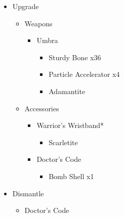 \begin{upgrade}
	\begin{itemize}
		\item Upgrade
			\begin{itemize}
				\item Weapons
					\begin{itemize}
						\item Umbra
							\begin{itemize}
								\item Sturdy Bone x36
								\item Particle Accelerator x4
								\item Adamantite
							\end{itemize}
					\end{itemize}
				\item Accessories
					\begin{itemize}
						\item Warrior's Wristband*
							\begin{itemize}
								\item Scarletite
							\end{itemize}
						\item Doctor's Code
							\begin{itemize}
								\item Bomb Shell x1
							\end{itemize}
					\end{itemize}
			\end{itemize}
		\item Dismantle
			\begin{itemize}
				\item Doctor's Code
			\end{itemize}
	\end{itemize}
\end{upgrade}

